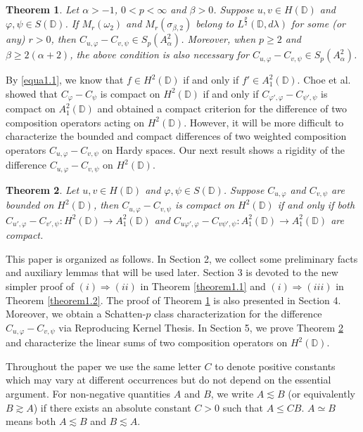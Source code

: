 \documentclass[preprint,12pt,times]{elsarticle}
\newtheorem{theorem}{Theorem}[section]
\theoremstyle{definition}
\theoremstyle{remark}
\numberwithin{equation}{section}
\begin{document}
\begin{theorem}\label{theorem1.3}
Let $\alpha>-1$, $0<p<\infty$ and $\beta>0$. Suppose $u,v\in H(\mathbb{D})$ and $\varphi,\psi\in S(\mathbb{D})$. If $M_r(\omega_2)$ and $M_r(\sigma_{\beta,2})$ belong to $L^{\frac{p}{2}}(\mathbb{D},d\lambda)$ for some (or any) $r>0$, then $C_{u,\varphi}-C_{v,\psi}\in S_p(A_{\alpha}^2)$. Moreover, when $p\geq 2$ and $\beta\geq 2(\alpha+2)$, the above condition is also necessary for $C_{u,\varphi}-C_{v,\psi}\in S_p(A_{\alpha}^2)$.
\end{theorem}

By \eqref{equa1.1}, we know that $f\in H^2(\mathbb{D})$ if and only if $f'\in A_{1}^2(\mathbb{D})$. Choe et al. \cite{4} showed that $C_{\varphi}-C_{\psi}$ is compact on $H^2(\mathbb{D})$ if and only if $C_{\varphi',\varphi}-C_{\psi',\psi}$ is compact on $A_1^2(\mathbb{D})$ and obtained a compact criterion for the difference of two composition operators acting on $H^2(\mathbb{D})$. However, it will be more difficult to characterize the bounded and compact differences of two weighted composition operators $C_{u,\varphi}-C_{v,\psi}$ on Hardy spaces. Our next result shows a rigidity of the difference $C_{u,\varphi}-C_{v,\psi}$ on $H^2(\mathbb{D})$.
 
\begin{theorem}\label{theorem1.4}
Let $u,v\in H(\mathbb{D})$ and $\varphi,\psi\in S(\mathbb{D})$. Suppose $C_{u,\varphi}$ and $C_{v,\psi}$ are bounded on $H^2(\mathbb{D})$, then $C_{u,\varphi}-C_{v,\psi}$ is compact on $H^2(\mathbb{D})$ if and only if both $C_{u',\varphi}-C_{v',\psi}: H^2(\mathbb{D})\to A_1^2(\mathbb{D})$ and $C_{u\varphi',\varphi}-C_{v\psi',\psi}:A_1^2(\mathbb{D})\to A_1^2(\mathbb{D})$ are compact.
\end{theorem}

This paper is organized as follows. In Section 2, we collect some preliminary facts and auxiliary lemmas that will be used later. Section 3 is devoted to the new simpler proof of $(i)\Rightarrow(ii)$ in Theorem \ref{theorem1.1} and $(i)\Rightarrow(iii)$ in Theorem \ref{theorem1.2}. The proof of Theorem \ref{theorem1.3} is also presented in Section 4. Moreover, we obtain a Schatten-$p$ class characterization for the difference $C_{u,\varphi}-C_{v,\psi}$ via Reproducing Kernel Thesis. In Section 5, we prove Theorem \ref{theorem1.4} and characterize the linear sums of two composition operators on $H^2(\mathbb{D})$.

Throughout the paper we use the same letter $C$ to denote positive constants which may vary at different occurrences but do not depend on the essential argument. For non-negative quantities $A$ and $B$, we write $A\lesssim B$ (or equivalently $B\gtrsim A$) if there exists an absolute constant $C>0$ such that $A\leq CB$. $A\simeq B$ means both $A\lesssim B$ and $B\lesssim A$. 
\end{document}
